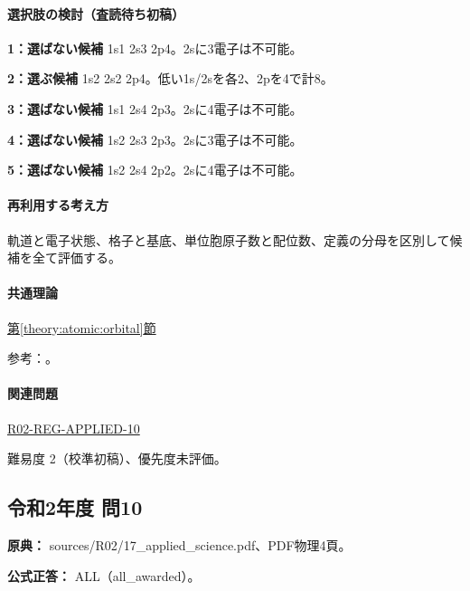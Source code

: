\paragraph{選択肢の検討（査読待ち初稿）}\mbox{}\par

\noindent\textbf{1：選ばない候補} 1s1 2s3 2p4。2sに3電子は不可能。\par

\noindent\textbf{2：選ぶ候補} 1s2 2s2 2p4。低い1s/2sを各2、2pを4で計8。\par

\noindent\textbf{3：選ばない候補} 1s1 2s4 2p3。2sに4電子は不可能。\par

\noindent\textbf{4：選ばない候補} 1s2 2s3 2p3。2sに3電子は不可能。\par

\noindent\textbf{5：選ばない候補} 1s2 2s4 2p2。2sに4電子は不可能。\par

\paragraph{再利用する考え方} 軌道と電子状態、格子と基底、単位胞原子数と配位数、定義の分母を区別して候補を全て評価する。

\paragraph{共通理論} \hyperref[theory:atomic:orbital]{第\ref*{theory:atomic:orbital}節}

\par 参考：\cite{atomic_quantum,atomic_nist2019}。

\paragraph{関連問題} \hyperref[q:r02-reg-applied-10]{R02-REG-APPLIED-10}

\par 難易度 2（校準初稿）、優先度未評価。

\subsection{令和2年度 問10}
\label{q:r02-reg-applied-10}

\noindent\textbf{原典：} sources/R02/17\_applied\_science.pdf、PDF物理4頁。

\textbf{公式正答：} ALL（all\_awarded）。

